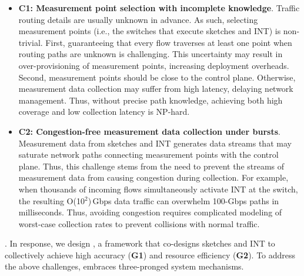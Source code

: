 \begin{itemize}[leftmargin=*]
%
    \item \textbf{C1: Measurement point selection with incomplete knowledge}. Traffic routing details are usually unknown in advance. As such, selecting measurement points (i.e., the switches that execute sketches and INT) is non-trivial. First, guaranteeing that every flow traverses at least one point when routing paths are unknown is challenging. This uncertainty may result in over-provisioning of measurement points, increasing deployment overheads. Second, measurement points should be close to the control plane. Otherwise, measurement data collection may suffer from high latency, delaying network management. Thus, without precise path knowledge, achieving both high coverage and low collection latency is NP-hard. 
%
%
    \item \textbf{C2: Congestion-free measurement data collection under bursts}. Measurement data from sketches and INT generates data streams that may saturate network paths connecting measurement points with the control plane. Thus, this challenge stems from the need to prevent the streams of measurement data from causing congestion during collection. For example, when thousands of incoming flows simultaneously activate INT at the switch, the resulting O(10$^2$)\,Gbps data traffic can overwhelm 100-Gbps paths in milliseconds. Thus, avoiding congestion requires complicated modeling of worst-case collection rates to prevent collisions with normal traffic. 
%
\end{itemize}

. In response, we design \sysname, a framework that co-designs sketches and INT to collectively achieve high accuracy (\textbf{G1}) and resource efficiency (\textbf{G2}). To address the above challenges, \sysname embraces three-pronged system mechanisms. 

